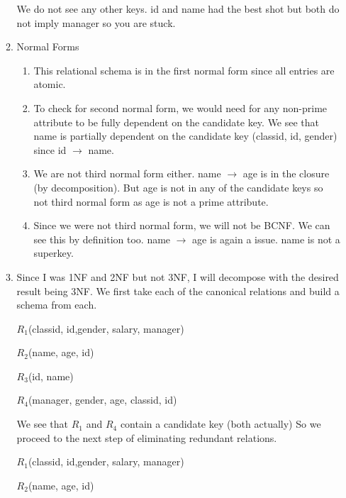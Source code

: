 \documentclass[11pt]{article}
\begin{document}
\begin{enumerate}
\begin{enumerate}
We do not see any other keys.  id and name had the best shot but both do not imply manager so you are stuck.
\item Normal Forms
\begin{enumerate}
\item This relational schema is in the first normal form since all entries are atomic.
\item To check for second normal form, we would need for any non-prime attribute to be fully dependent on the candidate key.  We see that name is partially dependent on the candidate key (classid, id, gender) since id $\rightarrow$ name.
\item We are not third normal form either.  name $\rightarrow$ age is in the closure (by decomposition).  But age is not in any of the candidate keys so not third normal form as age is not a prime attribute.
\item Since we were not third normal form, we will not be BCNF.  We can see this by definition too.  name $\rightarrow$ age is again a issue.  name is not a superkey. 
\end{enumerate}
\item Since I was 1NF and 2NF but not 3NF, I will decompose with the desired result being 3NF.  We first take each of the canonical relations and build a schema from each.

$R_1$(classid, id,gender, salary, manager)

$R_2$(name, age, id)

$R_3$(id, name)

$R_4$(manager, gender, age, classid, id)

We see that $R_1$ and $R_4$ contain a candidate key (both actually) So we proceed to the next step of eliminating redundant relations.

$R_1$(classid, id,gender, salary, manager)

$R_2$(name, age, id)


\end{enumerate}
\end{enumerate}
\end{document}
